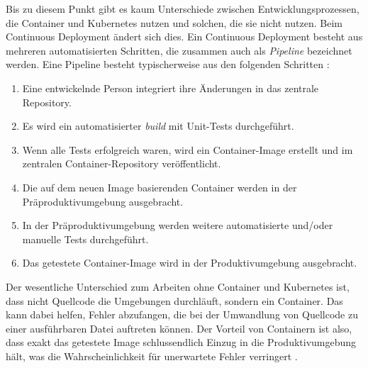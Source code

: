 \documentclass[11pt,a4paper]{article}
\begin{document}
Bis zu diesem Punkt gibt es kaum Unterschiede zwischen Entwicklungsprozessen,
die Container und Kubernetes nutzen und solchen, die sie nicht nutzen.
Beim {Continuous Deployment} ändert sich dies.
Ein Continuous Deployment besteht aus mehreren automatisierten Schritten,
die zusammen auch als \emph{Pipeline} bezeichnet werden.
Eine Pipeline besteht typischerweise aus den folgenden Schritten \cite{domingus2022cloud}:
\begin{enumerate}
  \item Eine entwickelnde Person integriert ihre Änderungen in das zentrale Repository.
  \item Es wird ein automatisierter \emph{build} mit Unit-Tests durchgeführt.
  \item Wenn alle Tests erfolgreich waren, wird ein Container-Image erstellt und im zentralen Container-Repository veröffentlicht.
  \item Die auf dem neuen Image basierenden Container werden in der Präproduktivumgebung ausgebracht.
  \item In der Präproduktivumgebung werden weitere automatisierte und/oder manuelle Tests durchgeführt.
  \item Das getestete Container-Image wird in der Produktivumgebung ausgebracht.
\end{enumerate}
Der wesentliche Unterschied zum Arbeiten ohne Container und Kubernetes ist, dass nicht Quellcode
die Umgebungen durchläuft, sondern ein Container. Das kann dabei helfen, Fehler abzufangen,
die bei der Umwandlung von Quellcode zu einer ausführbaren Datei auftreten können.
Der Vorteil von Containern ist also, dass exakt das getestete Image schlussendlich
Einzug in die Produktivumgebung hält, was die Wahrscheinlichkeit für unerwartete Fehler verringert  \cite{domingus2022cloud}.







\end{document}
